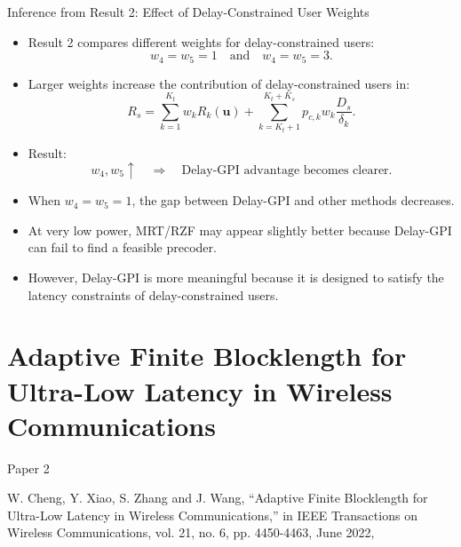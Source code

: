 \documentclass{beamer}
\begin{document}
\begin{frame}{Inference from Result 2: Effect of Delay-Constrained User Weights}
\small

\begin{itemize}
    \item Result 2 compares different weights for delay-constrained users:
    \[
        w_4=w_5=1
        \quad \text{and} \quad
        w_4=w_5=3.
    \]

    \item Larger weights increase the contribution of delay-constrained users in:
    \[
        R_s =
        \sum_{k=1}^{K_t} w_k R_k(\mathbf{u})
        +
        \sum_{k=K_t+1}^{K_t+K_s}
        p_{c,k} w_k \frac{D_s}{\delta_k}.
    \]

    \item Result:
    \[
        w_4,w_5 \uparrow
        \quad \Rightarrow \quad
        \text{Delay-GPI advantage becomes clearer.}
    \]

    \item When $w_4=w_5=1$, the gap between Delay-GPI and other methods decreases.

    \item At very low power, MRT/RZF may appear slightly better because Delay-GPI can fail to find a feasible precoder.

    \item However, Delay-GPI is more meaningful because it is designed to satisfy the latency constraints of delay-constrained users.
\end{itemize}

\end{frame}

\section{Adaptive Finite Blocklength for Ultra-Low Latency in Wireless Communications}

\begin{frame}{Paper 2}

W. Cheng, Y. Xiao, S. Zhang and J. Wang, ``Adaptive Finite Blocklength for Ultra-Low Latency in Wireless Communications,'' in IEEE Transactions on Wireless Communications, vol. 21, no. 6, pp. 4450-4463, June 2022,

\end{frame}
\end{document}
